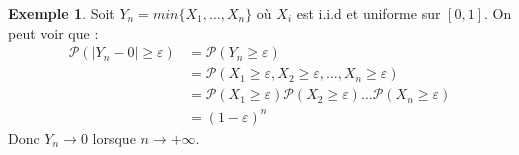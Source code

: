\documentclass[a4paper,12pt]{report}
\theoremstyle{definition}
\newcommand{\ra}{\rightarrow}
\renewcommand{\(}{\left(}
\renewcommand{\)}{\right)}
\renewcommand{\P}{\mathcal{P}}
\newtheorem{exmp}[thm]{Exemple}
\begin{document}
        \begin{exmp}
            Soit $Y_n = min\{X_1,\dots,X_n\}$ où $X_i$ est i.i.d et uniforme sur $[0,1]$. On peut voir que :
            \begin{align*}
                \P(|Y_n-0|\geq\varepsilon) &= \P(Y_n\geq \varepsilon) \\
                &= \P(X_1\geq \varepsilon,X_2\geq \varepsilon,\dots,X_n\geq \varepsilon) \\
                &= \P(X_1\geq \varepsilon)\P(X_2\geq \varepsilon)\dots\P(X_n\geq \varepsilon) \\
                &= (1-\varepsilon)^n
            \end{align*}
            Donc $Y_n\ra0$ lorsque $n\ra+\infty$.
        \end{exmp}
        
\end{document}
